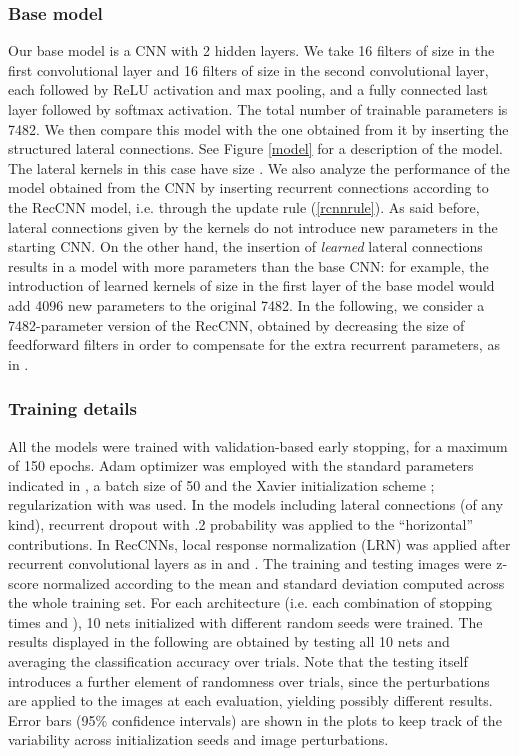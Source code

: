 \documentclass[11pt,oneside,reqno]{amsart}
\begin{document}
 \subsubsection{Base model}
 Our base model is a CNN with 2 hidden layers. We take 16 filters of size  in the first convolutional layer and 16 filters of size  in the second convolutional layer, each followed by ReLU activation and max pooling, and a fully connected last layer followed by softmax activation. The total number of trainable parameters is 7482. We then compare this model with the one obtained from it by inserting the structured lateral connections. See Figure \ref{model} for a description of the model. The lateral kernels in this case have size . We also analyze the performance of the model obtained from the CNN by inserting recurrent connections according to the RecCNN model, i.e. through the update rule (\ref{rcnnrule}). As said before, lateral connections given by the kernels  do not introduce new parameters in the starting CNN. On the other hand, the insertion of \emph{learned} lateral connections results in a model with more parameters than the base CNN: for example, the introduction of learned kernels of size  in the first layer of the base model would add 4096 new parameters to the original 7482. In the following, we consider a 7482-parameter version of the RecCNN, obtained by decreasing the size of feedforward filters in order to compensate for the extra recurrent parameters, as in \citet{spoerer}.

 
 \subsubsection{Training details} All the models were trained with validation-based early stopping, for a maximum of 150 epochs. Adam optimizer was employed with the standard parameters indicated in \citet{adam}, a batch size of 50 and the Xavier initialization scheme \citep{xavier};  regularization with  was used. In the models including lateral connections (of any kind), recurrent dropout \citep{recdrop} with .2 probability was applied to the ``horizontal'' contributions. In RecCNNs, local response normalization (LRN) was applied after recurrent convolutional layers as in \citet{liang} and \citet{spoerer}. The training and testing images were z-score normalized according to the mean and standard deviation computed across the whole training set. For each architecture (i.e. each combination of stopping times  and ), 10 nets initialized with different random seeds were trained. The results displayed in the following are obtained by testing all 10 nets and averaging the classification accuracy over trials. Note that the testing itself introduces a further element of randomness over trials, since the perturbations are applied to the images at each evaluation, yielding possibly different results. Error bars (95\% confidence intervals) are shown in the plots to keep track of the variability across initialization seeds and image perturbations.
 
\end{document}
